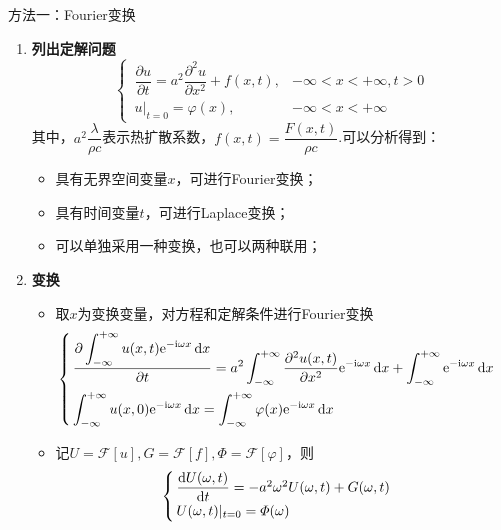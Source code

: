 \solve 方法一：Fourier变换
\begin{enumerate}
	\item \textbf{列出定解问题}
	\begin{equation}
		\begin{cases}
			\, \dfrac{\partial u}{\partial t} = a^2 \dfrac{\partial^2 u}{\partial x^2} + f(x,t), & -\infty < x< +\infty,t>0\\[0.5em]
			\, u|_{t = 0} = \varphi(x), & -\infty < x < + \infty
		\end{cases}
	\end{equation}
	其中，$\displaystyle a^2 \dfrac{\lambda}{\rho c}$表示热扩散系数，$f(x,t) = \dfrac{F(x,t)}{\rho c}$.可以分析得到：
	\begin{itemize}
		\item 具有无界空间变量$x$，可进行Fourier变换；
		\item 具有时间变量$t$，可进行Laplace变换；
		\item 可以单独采用一种变换，也可以两种联用；
	\end{itemize}
	
	\item \textbf{变换}
	\begin{itemize}
		\item 取$x$为变换变量，对方程和定解条件进行Fourier变换
		\begin{equation}
			\begin{cases}
				\, \dfrac{\displaystyle \partial \int_{-\infty}^{+\infty} u(x,t){\rm{e}}^{- {\rm{i}} \omega x} \, {\rm{d}} x}{\partial t} = \displaystyle a^2 \int_{- \infty}^{+ \infty} \dfrac{\partial^2 u(x,t)}{\partial x^2} {\rm{e}}^{- {\rm{i}} \omega x}\, {\rm{d}} x + \int_{- \infty}^{+\infty}{\rm{e}}^{- {\rm{i}} \omega x} \, {\rm{d}} x\\[1em]
				\, \displaystyle \int_{-\infty}^{+\infty} u(x,0) {\rm{e}}^{- {\rm{i}} \omega x}\, {\rm{d}} x = \int_{- \infty}^{+ \infty}\varphi(x){\rm{e}}^{-{\rm{i}} \omega x} \, {\rm{d}} x
			\end{cases}
		\end{equation}
		
		\item 记$U = \mathcal{F}[u], G = \mathcal{F}[f], \varPhi = \mathcal{F}[\varphi]$，则
		\begin{equation}
			\begin{cases}
				\, \dfrac{{\rm{d}} U(\omega, t)}{{\rm{d}} t} = - a^2 \omega^2U(\omega, t) + G(\omega, t)\\
				\, U(\omega, t)|_{t = 0} = \varPhi(\omega)
			\end{cases}
		\label{无界杆传热}
		\end{equation}
	\end{itemize}
	

\end{enumerate}

